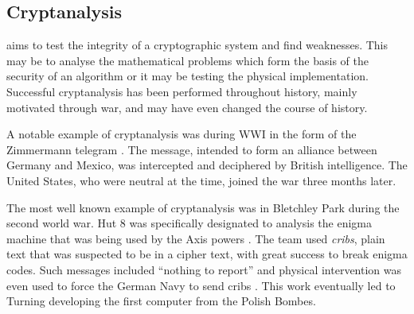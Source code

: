 
\subsection{Cryptanalysis}

 aims to test the integrity of a cryptographic system and find weaknesses. This may be to analyse the mathematical problems which form the basis of the security of an algorithm or it may be testing the physical implementation. Successful cryptanalysis has been performed throughout history, mainly motivated through war, and may have even changed the course of history.

A notable example of cryptanalysis was during WWI in the form of the Zimmermann telegram \cite{zimmermann1917}. The message, intended to form an alliance between Germany and Mexico, was intercepted and deciphered by British intelligence. The United States, who were neutral at the time, joined the war three months later.

The most well known example of cryptanalysis was in Bletchley Park during the second world war. Hut 8 was specifically designated to analysis the enigma machine that was being used by the Axis powers \cite{hodges2012alan}. The team used \emph{cribs}, plain text that was suspected to be in a cipher text, with great success to break enigma codes. Such messages included ``nothing to report'' and physical intervention was even used to force the German Navy to send cribs \cite{hodges2012alan}. This work eventually led to Turning developing the first computer from the Polish Bombes.

%
%
%
%

